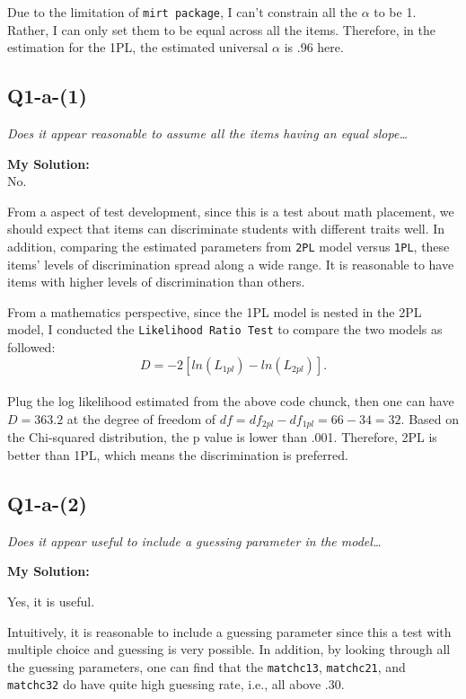 \documentclass[
]{article}
\begin{document}
Due to the limitation of \texttt{mirt\ package}, I can't constrain all
the \(\alpha\) to be 1. Rather, I can only set them to be equal across
all the items. Therefore, in the estimation for the 1PL, the estimated
universal \(\alpha\) is .96 here.

\hypertarget{q1-a-1}{%
\subsection{Q1-a-(1)}\label{q1-a-1}}

\emph{Does it appear reasonable to assume all the items having an equal
slope\ldots{}}

\textbf{My Solution:}\\
No.

From a aspect of test development, since this is a test about math
placement, we should expect that items can discriminate students with
different traits well. In addition, comparing the estimated parameters
from \texttt{2PL} model versus \texttt{1PL}, these items' levels of
discrimination spread along a wide range. It is reasonable to have items
with higher levels of discrimination than others.

From a mathematics perspective, since the 1PL model is nested in the 2PL
model, I conducted the \texttt{Likelihood\ Ratio\ Test} to compare the
two models as followed: \[D = -2[ln(L_{1pl})-ln(L_{2pl})] .\]\\
Plug the log likelihood estimated from the above code chunck, then one
can have \(D = 363.2\) at the degree of freedom of
\(df = df_{2pl}-df_{1pl} = 66-34 =32\). Based on the Chi-squared
distribution, the p value is lower than .001. Therefore, 2PL is better
than 1PL, which means the discrimination is preferred.

\hypertarget{q1-a-2}{%
\subsection{Q1-a-(2)}\label{q1-a-2}}

\emph{Does it appear useful to include a guessing parameter in the
model\ldots{}}

\textbf{My Solution:}

Yes, it is useful.

Intuitively, it is reasonable to include a guessing parameter since this
a test with multiple choice and guessing is very possible. In addition,
by looking through all the guessing parameters, one can find that the
\texttt{matchc13}, \texttt{matchc21}, and \texttt{matchc32} do have
quite high guessing rate, i.e., all above .30.
\end{document}
